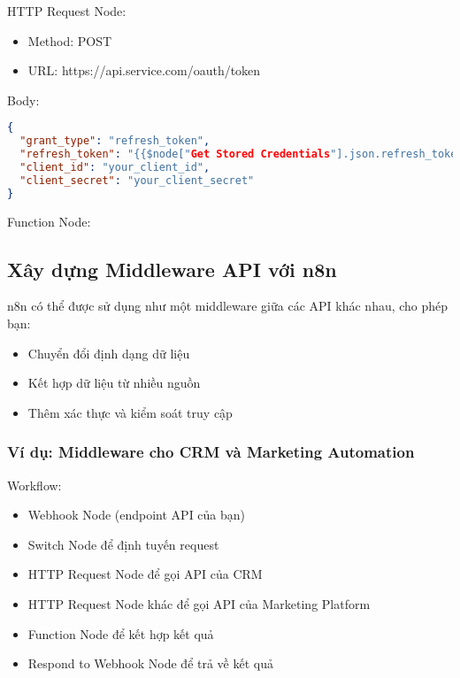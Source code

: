 HTTP Request Node:
\begin{itemize}
    \item Method: POST
    \item URL: https://api.service.com/oauth/token
\end{itemize}

Body:
\begin{lstlisting}[language=JSON]
{
  "grant_type": "refresh_token",
  "refresh_token": "{{$node["Get Stored Credentials"].json.refresh_token}}",
  "client_id": "your_client_id",
  "client_secret": "your_client_secret"
}
\end{lstlisting}

Function Node:



\subsection{Xây dựng Middleware API với n8n}

n8n có thể được sử dụng như một middleware giữa các API khác nhau, cho phép bạn:
\begin{itemize}
    \item Chuyển đổi định dạng dữ liệu
    \item Kết hợp dữ liệu từ nhiều nguồn
    \item Thêm xác thực và kiểm soát truy cập
\end{itemize}

\subsubsection{Ví dụ: Middleware cho CRM và Marketing Automation}

Workflow:
\begin{itemize}
    \item Webhook Node (endpoint API của bạn)
    \item Switch Node để định tuyến request
    \item HTTP Request Node để gọi API của CRM
    \item HTTP Request Node khác để gọi API của Marketing Platform
    \item Function Node để kết hợp kết quả
    \item Respond to Webhook Node để trả về kết quả
\end{itemize}


